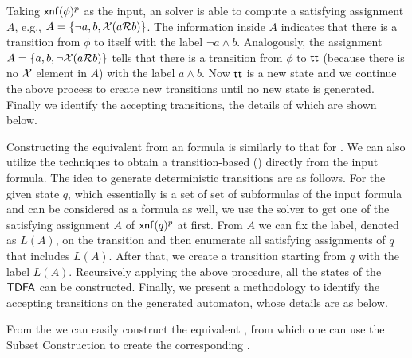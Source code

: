 Taking $\xnf(\phi)^p$ as the input, an \SAT solver is able to compute a satisfying assignment $A$, e.g., $A=\{\neg a, b, \X(a\R b)\}$. The information inside $A$ indicates that there is a transition from $\phi$ to itself with the label $\neg a\wedge b$. Analogously, the assignment $A=\{a, b, \neg \X(a\R b)\}$ tells that there is a transition from $\phi$ to $\tt$ (because there is no $\X$ element in $A$) with the label $a\wedge b$. Now $\tt$ is a new state and we continue the above process to create new transitions until no new state is generated. Finally we identify the accepting transitions, the details of which are shown below. 

Constructing the equivalent \DFA from an \ltlf formula is similarly to that for \NFA. We can also utilize the \SAT techniques to obtain a transition-based \DFA (\TDFA) directly from the input formula. The idea to generate deterministic transitions are as follows. For the given state $q$, which essentially is a set of set of subformulas of the input formula and can be considered as a formula as well, we use the \SAT solver to get one of the satisfying assignment $A$ of $\xnf(q)^p$ at first. From $A$ we can fix the label, denoted as $L(A)$, on the transition and then enumerate all satisfying assignments of $q$ that includes $L(A)$. After that, we create a transition starting from $q$ with the label $L(A)$. Recursively applying the above procedure, all the states of the $\TDFA$ can be constructed. Finally, we present a methodology to identify the accepting transitions on the generated automaton, whose details are as below. 

From the \TDFA we can easily construct the equivalent \NFA, from which one can use the Subset Construction to create the corresponding \DFA.




